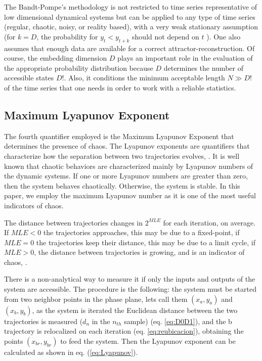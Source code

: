 The Bandt-Pompe's methodology is not restricted to time series
representative of low dimensional dynamical systems but can be
applied to any type of time series (regular, chaotic, noisy, or
reality based), with a very weak stationary assumption (for $k =
D$, the probability for $y_t < y_{t+k}$ should not depend on $t$
\cite{Pompe2002}). One also assumes that enough data are available for
a correct attractor-reconstruction. Of course, the embedding
dimension $D$ plays an important role in the evaluation of the
appropriate probability distribution because $D$ determines the
number of accessible states $D!$. Also, it conditions the minimum
acceptable length $N \gg D!$ of the time series that one needs in
order to work with a reliable statistics.


\subsection{Maximum Lyapunov Exponent}

The fourth quantifier employed is the Maximum Lyapunov Exponent that determines the presence of chaos.
The Lyapunov exponents are quantifiers that characterize how the
separation between two trajectories evolves, \cite{Sprott2003}. It
is well known that chaotic behaviors are characterized
mainly by Lyapunov numbers of the dynamic systems. If one or more
Lyapunov numbers are greater than zero, then the system behaves
chaotically. Otherwise, the system is stable. In this paper, we
employ the maximum Lyapunov number as it is one of the most useful
indicators of chaos.

The distance between trajectories changes in $2^{MLE}$ for each
iteration, on average. If $MLE<0$ the trajectories approaches,
this may be due to a fixed-point, if $MLE=0$ the trajectories keep
their distance, this may be due to a limit cycle, if $MLE>0$, the
distance between trajectories is growing, and is an indicator of
chaos, \cite{Sprott2003}.

There is a non-analytical way to measure it if only the inputs and
outputs of the system are accessible. The procedure is the
following: the system must be started from two neighbor points in
the phase plane, lets call them $(x_a,y_a)$ and $(x_b,y_b)$, as
the system is iterated the Euclidean distance between the two
trajectories is measured ($d_n$ in the $n_{th}$ sample) (eq.
\ref{eq:D0D1}), and the b trajectory is relocalized on each
iteration  (eq. \ref{eq:reubicacion}), obtaining the points
$(x_{br},y_{br})$ to feed the system. Then the Lyapunov exponent
can be calculated as shown in eq. (\ref{eq:Lyapunov}).

